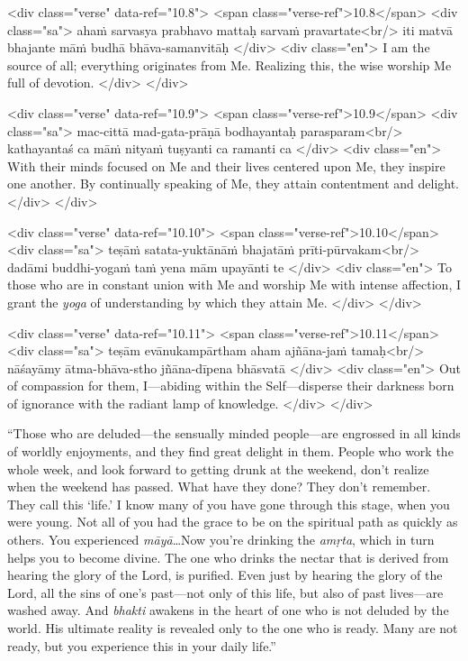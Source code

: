 \begin{html}
<div class="verse" data-ref="10.8">
  <span class="verse-ref">10.8</span>
  <div class="sa">
    ahaṁ sarvasya prabhavo mattaḥ sarvaṁ pravartate<br/>
    iti matvā bhajante māṁ budhā bhāva-samanvitāḥ
  </div>
  <div class="en">
    I am the source of all; everything originates from Me. Realizing this, the wise worship Me full of devotion.
  </div>
</div>
\end{html}



\begin{html}
<div class="verse" data-ref="10.9">
  <span class="verse-ref">10.9</span>
  <div class="sa">
    mac-cittā mad-gata-prāṇā bodhayantaḥ parasparam<br/>
    kathayantaś ca māṁ nityaṁ tuṣyanti ca ramanti ca
  </div>
  <div class="en">
    With their minds focused on Me and their lives centered upon Me, they inspire one another. By continually speaking of Me, they attain contentment and delight.
  </div>
</div>
\end{html}



\begin{html}
<div class="verse" data-ref="10.10">
  <span class="verse-ref">10.10</span>
  <div class="sa">
    teṣāṁ satata-yuktānāṁ bhajatāṁ prīti-pūrvakam<br/>
    dadāmi buddhi-yogaṁ taṁ yena mām upayānti te
  </div>
  <div class="en">
    To those who are in constant union with Me and worship Me with intense affection, I grant the \textit{yoga} of understanding by which they attain Me.
  </div>
</div>
\end{html}



\begin{html}
<div class="verse" data-ref="10.11">
  <span class="verse-ref">10.11</span>
  <div class="sa">
    teṣām evānukampārtham aham ajñāna-jaṁ tamaḥ<br/>
    nāśayāmy ātma-bhāva-stho jñāna-dīpena bhāsvatā
  </div>
  <div class="en">
    Out of compassion for them, I---abiding within the Self---disperse their darkness born of ignorance with the radiant lamp of knowledge.
  </div>
</div>
\end{html}


\enquote{Those who are deluded---the sensually minded people---are engrossed in all kinds of worldly enjoyments, and they find great delight in them. People who work the whole week, and look forward to getting drunk at the weekend, don’t realize when the weekend has passed. What have they done? They don’t remember. They call this \enquote{life.} I know many of you have gone through this stage, when you were young. Not all of you had the grace to be on the spiritual path as quickly as others. You experienced \textit{māyā}\ldots Now you’re drinking the \textit{amṛta}, which in turn helps you to become divine. The one who drinks the nectar that is derived from hearing the glory of the Lord, is purified. Even just by hearing the glory of the Lord, all the sins of one’s past---not only of this life, but also of past lives---are washed away. And \textit{bhakti} awakens in the heart of one who is not deluded by the world. His ultimate reality is revealed only to the one who is ready. Many are not ready, but you experience this in your daily life.}

